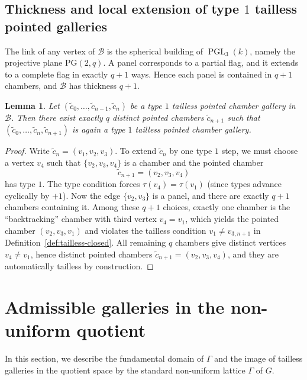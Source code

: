 \documentclass[11pt]{amsart}
\newtheorem{lemma}[thm]{Lemma}
\theoremstyle{definition}
\theoremstyle{remark}
\numberwithin{equation}{section}
\begin{document}
\subsection{Thickness and local extension of type $1$ tailless pointed galleries}\label{subsec:local-extension-pgl3}

The link of any vertex of $\mathcal{B}$ is the spherical building of $\operatorname{PGL}_3(k)$,
namely the projective plane $\mathrm{PG}(2,q)$.
A panel corresponds to a partial flag, and it extends to a complete flag in exactly $q+1$ ways.
Hence each panel is contained in $q+1$ chambers, and $\mathcal{B}$ has thickness $q+1$.

\begin{lemma}\label{lem:local-extension-pgl3}
Let $(\widetilde{c}_0,\ldots,\widetilde{c}_{n-1},\widetilde{c}_n)$ be a type $1$ tailless pointed chamber gallery in $\mathcal{B}$.
Then there exist exactly $q$ distinct pointed chambers $\widetilde{c}_{n+1}$ such that
$(\widetilde{c}_0,\ldots,\widetilde{c}_n,\widetilde{c}_{n+1})$ is again a type $1$ tailless pointed chamber gallery.
\end{lemma}

\begin{proof}
Write $\widetilde{c}_n=(v_1,v_2,v_3)$.
To extend $\widetilde{c}_n$ by one type $1$ step, we must choose a vertex $v_4$ such that
$\{v_2,v_3,v_4\}$ is a chamber and the pointed chamber
\[
\widetilde{c}_{n+1}=(v_2,v_3,v_4)
\]
has type $1$. The type condition forces $\tau(v_4)=\tau(v_1)$ (since types advance cyclically by $+1$).
Now the edge $\{v_2,v_3\}$ is a panel, and there are exactly $q+1$ chambers containing it.
Among these $q+1$ choices, exactly one chamber is the ``backtracking'' chamber with third vertex $v_4=v_1$,
which yields the pointed chamber $(v_2,v_3,v_1)$ and violates the tailless condition
$v_1\neq v_{3,n+1}$ in Definition~\ref{def:tailless-closed}.
All remaining $q$ chambers give distinct vertices $v_4\neq v_1$, hence distinct pointed chambers
$\widetilde{c}_{n+1}=(v_2,v_3,v_4)$, and they are automatically tailless by construction.
\end{proof}




\section{Admissible galleries in the non-uniform quotient}\label{sec:3}
In this section, we describe the fundamental domain of $\Gamma$ and the image of tailless galleries in the quotient space by the standard non-uniform lattice $\Gamma$ of $G$. 
\end{document}
